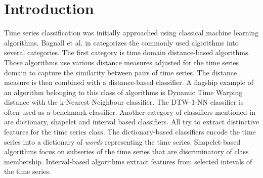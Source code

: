 \documentclass[a4paper,11pt,twoside]{report}
\theoremstyle{definition}
\begin{document}
%
%
%
%
%
\null\thispagestyle{empty}\newpage
\tableofcontents
\thispagestyle{empty}
\newpage %
\null\newpage


\null\thispagestyle{empty}\newpage
\pagestyle{fancy}
\setcounter{page}{11}


\chapter{Introduction}
Time series classification was initially approached using classical machine learning algorithms. Bagnall et al. in  \cite{bake_off} categorizes the commonly used algorithms into several categories. The first category is time domain distance-based algorithms. Those algorithms use various distance measures adjusted for the time series domain to capture the similarity between pairs of time series. The distance measure is then combined with a distance-based classifier. A flagship example of an algorithm belonging to this class of algorithms is Dynamic Time Warping distance with the k-Nearest Neighbour classifier. The DTW-1-NN classifier is often used as a benchmark classifier. Another category of classifiers mentioned in \cite{bake_off} are dictionary, shapelet and interval based classifiers. All try to extract distinctive features for the time series class. The dictionary-based classifiers encode the time series into a dictionary of \textit{words} representing the time series. Shapelet-based algorithms focus on subseries of the time series that are discriminatory of class membership. Interval-based algorithms extract features from selected intevals of the time series.
\end{document}
